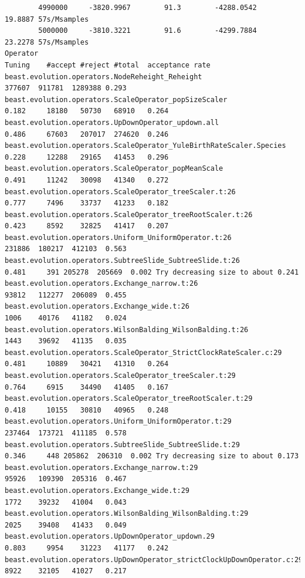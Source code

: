 \documentclass{article}
\begin{document}
{\begin{verbatim}
        4990000     -3820.9967        91.3        -4288.0542        19.8887 57s/Msamples
        5000000     -3810.3221        91.6        -4299.7884        23.2278 57s/Msamples
Operator                                                              Tuning	#accept	#reject	#total	acceptance rate
beast.evolution.operators.NodeReheight_Reheight                             	377607	911781	1289388	0.293 
beast.evolution.operators.ScaleOperator_popSizeScaler                 0.182 	18180	50730	68910	0.264 
beast.evolution.operators.UpDownOperator_updown.all                   0.486 	67603	207017	274620	0.246 
beast.evolution.operators.ScaleOperator_YuleBirthRateScaler.Species   0.228 	12288	29165	41453	0.296 
beast.evolution.operators.ScaleOperator_popMeanScale                  0.491 	11242	30098	41340	0.272 
beast.evolution.operators.ScaleOperator_treeScaler.t:26               0.777 	7496	33737	41233	0.182 
beast.evolution.operators.ScaleOperator_treeRootScaler.t:26           0.423 	8592	32825	41417	0.207 
beast.evolution.operators.Uniform_UniformOperator.t:26                      	231886	180217	412103	0.563 
beast.evolution.operators.SubtreeSlide_SubtreeSlide.t:26              0.481 	391	205278	205669	0.002 Try decreasing size to about 0.241
beast.evolution.operators.Exchange_narrow.t:26                              	93812	112277	206089	0.455 
beast.evolution.operators.Exchange_wide.t:26                                	1006	40176	41182	0.024 
beast.evolution.operators.WilsonBalding_WilsonBalding.t:26                  	1443	39692	41135	0.035 
beast.evolution.operators.ScaleOperator_StrictClockRateScaler.c:29    0.481 	10889	30421	41310	0.264 
beast.evolution.operators.ScaleOperator_treeScaler.t:29               0.764 	6915	34490	41405	0.167 
beast.evolution.operators.ScaleOperator_treeRootScaler.t:29           0.418 	10155	30810	40965	0.248 
beast.evolution.operators.Uniform_UniformOperator.t:29                      	237464	173721	411185	0.578 
beast.evolution.operators.SubtreeSlide_SubtreeSlide.t:29              0.346 	448	205862	206310	0.002 Try decreasing size to about 0.173
beast.evolution.operators.Exchange_narrow.t:29                              	95926	109390	205316	0.467 
beast.evolution.operators.Exchange_wide.t:29                                	1772	39232	41004	0.043 
beast.evolution.operators.WilsonBalding_WilsonBalding.t:29                  	2025	39408	41433	0.049 
beast.evolution.operators.UpDownOperator_updown.29                    0.803 	9954	31223	41177	0.242 
beast.evolution.operators.UpDownOperator_strictClockUpDownOperator.c:290.788 	8922	32105	41027	0.217 

\end{verbatim}}
\end{document}
